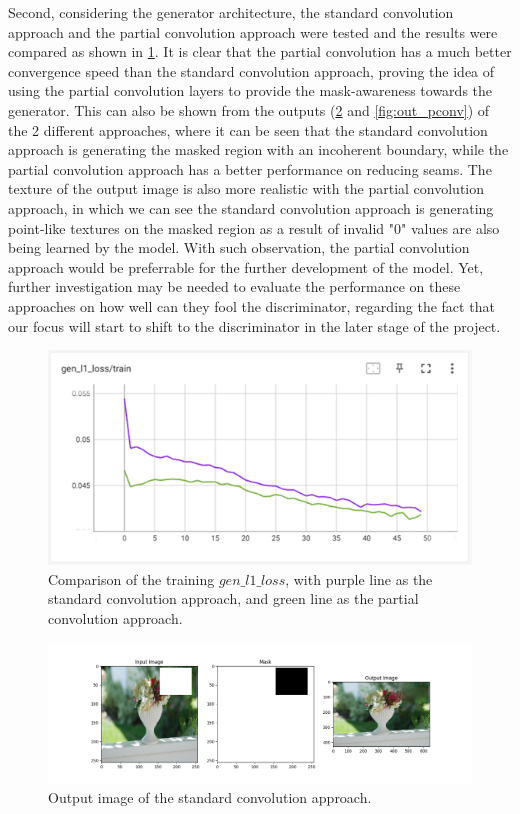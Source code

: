 \documentclass[10pt,twocolumn,letterpaper]{article}
\begin{document}
Second, considering the generator architecture, the standard convolution approach and the partial convolution approach were tested and the results were compared as shown in \cref{fig:stand_vs_pconv}. It is 
clear that the partial convolution has a much better convergence speed than the standard convolution approach, proving the idea of using the partial convolution layers to provide the mask-awareness towards 
the generator. This can also be shown from the outputs (\cref{fig:out_standconv} and \cref{fig:out_pconv}) of the 2 different approaches, where it can be seen that the standard convolution approach is 
generating the masked region with an incoherent boundary, while the partial convolution approach has a better performance on reducing seams. The texture of the output image is also more realistic with the 
partial convolution approach, in which we can see the standard convolution approach is generating point-like textures on the masked region as a result of invalid "0" values are also being learned by the model. 
With such observation, the partial convolution approach would be preferrable for the further development of the model. Yet, further investigation may be needed to evaluate the performance on these approaches 
on how well can they fool the discriminator, regarding the fact that our focus will start to shift to the discriminator in the later stage of the project.

\begin{figure}[t]
    \centering
    \includegraphics[width=\linewidth]{figures/milestone/stand_vs_pconv.png}
    \caption{Comparison of the training $gen\_l1\_loss$, with purple line as the standard convolution approach, and green line as the partial convolution approach.}
    \label{fig:stand_vs_pconv}
\end{figure}

\begin{figure}[t]
    \centering
    \includegraphics[width=\linewidth]{figures/milestone/out_standconv.png}
    \caption{Output image of the standard convolution approach.}
    \label{fig:out_standconv}
\end{figure}
\end{document}
